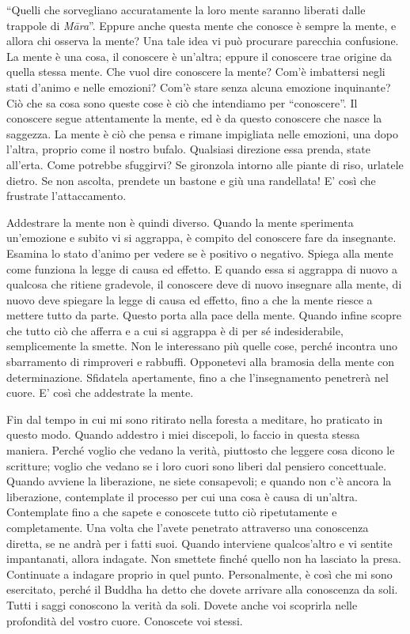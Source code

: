 ``Quelli che sorvegliano accuratamente la loro mente saranno liberati
dalle trappole di \emph{Māra}''.%
Eppure anche
questa mente che conosce è sempre la mente, e allora chi osserva la
mente? Una tale idea vi può procurare parecchia confusione. La mente è
una cosa, il conoscere è un'altra; eppure il conoscere trae origine da
quella stessa mente. Che vuol dire conoscere la mente? Com'è imbattersi
negli stati d'animo e nelle emozioni? Com'è stare senza alcuna emozione
inquinante? Ciò che sa cosa sono queste cose è ciò che intendiamo per
``conoscere''. Il conoscere segue attentamente la mente, ed è da questo
conoscere che nasce la saggezza. La mente è ciò che pensa e rimane
impigliata nelle emozioni, una dopo l'altra, proprio come il nostro
bufalo. Qualsiasi direzione essa prenda, state all'erta. Come potrebbe
sfuggirvi? Se gironzola intorno alle piante di riso, urlatele dietro. Se
non ascolta, prendete un bastone e giù una randellata! E' così che
frustrate l'attaccamento.

Addestrare la mente non è quindi diverso. Quando la mente sperimenta
un'emozione e subito vi si aggrappa, è compito del conoscere fare da
insegnante. Esamina lo stato d'animo per vedere se è positivo o
negativo. Spiega alla mente come funziona la legge di causa ed effetto.
E quando essa si aggrappa di nuovo a qualcosa che ritiene gradevole, il
conoscere deve di nuovo insegnare alla mente, di nuovo deve spiegare la
legge di causa ed effetto, fino a che la mente riesce a mettere tutto da
parte. Questo porta alla pace della mente. Quando infine scopre che
tutto ciò che afferra e a cui si aggrappa è di per sé indesiderabile,
semplicemente la smette. Non le interessano più quelle cose, perché
incontra uno sbarramento di rimproveri e rabbuffi. Opponetevi alla
bramosia della mente con determinazione. Sfidatela apertamente, fino a
che l'insegnamento penetrerà nel cuore. E' così che addestrate la mente.

Fin dal tempo in cui mi sono ritirato nella foresta a meditare, ho
praticato in questo modo. Quando addestro i miei discepoli, lo faccio in
questa stessa maniera. Perché voglio che vedano la verità, piuttosto che
leggere cosa dicono le scritture; voglio che vedano se i loro cuori sono
liberi dal pensiero concettuale. Quando avviene la liberazione, ne siete
consapevoli; e quando non c'è ancora la liberazione, contemplate il
processo per cui una cosa è causa di un'altra. Contemplate fino a che
sapete e conoscete tutto ciò ripetutamente e completamente. Una volta
che l'avete penetrato attraverso una conoscenza diretta, se ne andrà per
i fatti suoi. Quando interviene qualcos'altro e vi sentite impantanati,
allora indagate. Non smettete finché quello non ha lasciato la presa.
Continuate a indagare proprio in quel punto. Personalmente, è così che
mi sono esercitato, perché il Buddha ha detto che dovete arrivare alla
conoscenza da soli. Tutti i saggi conoscono la verità da soli. Dovete
anche voi scoprirla nelle profondità del vostro cuore. Conoscete voi
stessi.

